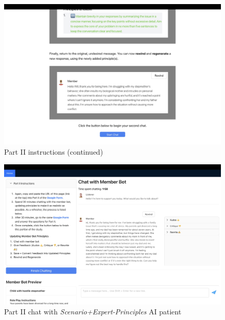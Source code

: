 \documentclass[11pt]{article}
\begin{document}
\begin{figure}[ht]
    \centering
    \includegraphics[width=\textwidth]{Study_Screenshots/Screen8.jpeg}
    \caption{Part II instructions (continued)}
    \label{fig:screen8}
\end{figure}

\begin{figure}[ht]
    \centering
    \includegraphics[width=\textwidth]{Study_Screenshots/Screen10.jpeg}
    \caption{Part II chat with \textit{Scenario+Expert-Principles} AI patient}
    \label{fig:screen10}
\end{figure}
\end{document}
